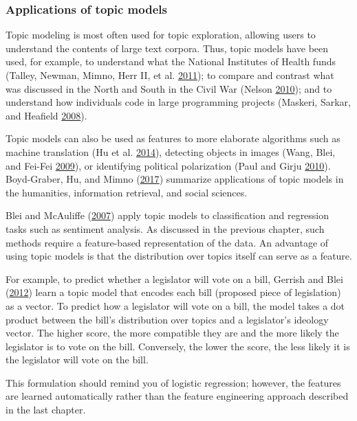 \documentclass[]{krantz}
\begin{document}
\subsubsection{Applications of topic
models}\label{applications-of-topic-models}

Topic modeling is most often used for topic exploration, allowing users
to understand the contents of large text corpora. Thus, topic models
have been used, for example, to understand what the National Institutes
of Health funds (Talley, Newman, Mimno, Herr II, et al.
\protect\hyperlink{ref-talley2011database}{2011}); to compare and
contrast what was discussed in the North and South in the Civil War
(Nelson \protect\hyperlink{ref-nelson-10}{2010}); and to understand how
individuals code in large programming projects (Maskeri, Sarkar, and
Heafield \protect\hyperlink{ref-maskeri-08}{2008}).

Topic models can also be used as features to more elaborate algorithms
such as machine translation (Hu et al.
\protect\hyperlink{ref-Hu:Zhai:Eidelman:Boyd-Graber-2014}{2014}),
detecting objects in images (Wang, Blei, and Fei-Fei
\protect\hyperlink{ref-wang-09b}{2009}), or identifying political
polarization (Paul and Girju \protect\hyperlink{ref-paul-10}{2010}).
Boyd-Graber, Hu, and Mimno
(\protect\hyperlink{ref-boyd-graber-17}{2017}) summarize applications of
topic models in the humanities, information retrieval, and social
sciences.

Blei and McAuliffe (\protect\hyperlink{ref-blei-07b}{2007}) apply topic
models to classification and regression tasks such as sentiment
analysis. As discussed in the previous chapter, such methods require a
feature-based representation of the data. An advantage of using topic
models is that the distribution over topics itself can serve as a
feature.

For example, to predict whether a legislator will vote on a bill,
Gerrish and Blei (\protect\hyperlink{ref-gerrish-12}{2012}) learn a
topic model that encodes each bill (proposed piece of legislation) as a
vector. To predict how a legislator will vote on a bill, the model takes
a dot product between the bill's distribution over topics and a
legislator's ideology vector. The higher score, the more compatible they
are and the more likely the legislator is to vote on the bill.
Conversely, the lower the score, the less likely it is the legislator
will vote on the bill.

This formulation should remind you of logistic regression; however, the
features are learned automatically rather than the feature engineering
approach described in the last chapter.
\end{document}
